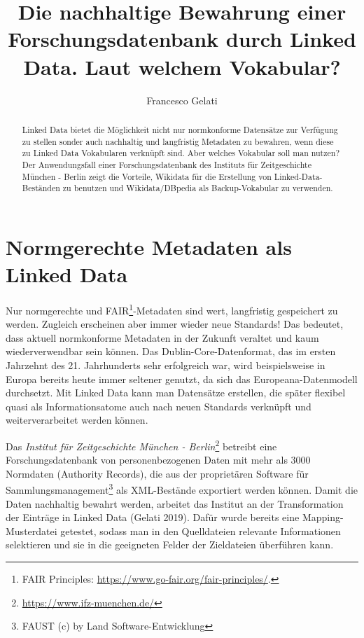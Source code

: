 \documentclass[a4paper,
fontsize=11pt,
oneside,
numbers=noperiodatend,
parskip=half-,
bibliography=totoc,
final
]{scrartcl}
\title{\LARGE{Die nachhaltige Bewahrung einer Forschungsdatenbank durch Linked Data. Laut welchem Vokabular?}} %
\author{Francesco Gelati} %
\date{}
\begin{document}
\maketitle
\thispagestyle{fancyplain} 

\begin{abstract}
\noindent
Linked Data bietet die Möglichkeit nicht nur normkonforme Datensätze zur
Verfügung zu stellen sonder auch nachhaltig und langfristig Metadaten zu
bewahren, wenn diese zu Linked Data Vokabularen verknüpft sind. Aber
welches Vokabular soll man nutzen? Der Anwendungsfall einer
Forschungsdatenbank des Instituts für Zeitgeschichte München - Berlin
zeigt die Vorteile, Wikidata für die Erstellung von
Linked-Data-Beständen zu benutzen und Wikidata/DBpedia als
Backup-Vokabular zu verwenden.
\end{abstract}

\hypertarget{normgerechte-metadaten-als-linked-data}{%
\section{Normgerechte Metadaten als Linked
Data}\label{normgerechte-metadaten-als-linked-data}}

Nur normgerechte und FAIR\footnote{FAIR Principles:
  \url{https://www.go-fair.org/fair-principles/}.}-Metadaten sind wert,
langfristig gespeichert zu werden. Zugleich erscheinen aber immer wieder
neue Standards! Das bedeutet, dass aktuell normkonforme Metadaten in der
Zukunft veraltet und kaum wiederverwendbar sein können. Das
Dublin-Core-Datenformat, das im ersten Jahrzehnt des 21. Jahrhunderts
sehr erfolgreich war, wird beispielsweise in Europa bereits heute immer
seltener genutzt, da sich das Europeana-Datenmodell durchsetzt. Mit
Linked Data kann man Datensätze erstellen, die später flexibel quasi als
Informationsatome auch nach neuen Standards verknüpft und
weiterverarbeitet werden können.

Das \emph{Institut für Zeitgeschichte München - Berlin}\footnote{\url{https://www.ifz-muenchen.de/}}
betreibt eine Forschungsdatenbank von personenbezogenen Daten mit mehr
als 3000 Normdaten (Authority Records), die aus der proprietären
Software für Sammlungsmanagement\footnote{FAUST (c) by Land
  Software-Entwicklung} als XML-Bestände exportiert werden können. Damit
die Daten nachhaltig bewahrt werden, arbeitet das Institut an der
Transformation der Einträge in Linked Data (Gelati 2019). Dafür wurde
bereits eine Mapping-Musterdatei getestet, sodass man in den
Quelldateien relevante Informationen selektieren und sie in die
geeigneten Felder der Zieldateien überführen kann.
\end{document}
